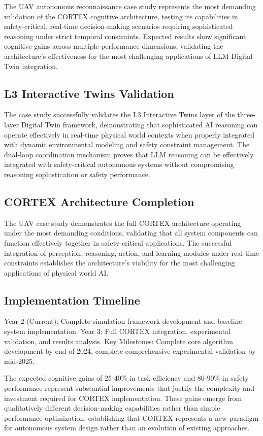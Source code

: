 The UAV autonomous reconnaissance case study represents the most demanding validation of the CORTEX cognitive architecture, testing its capabilities in safety-critical, real-time decision-making scenarios requiring sophisticated reasoning under strict temporal constraints. Expected results show significant cognitive gains across multiple performance dimensions, validating the architecture's effectiveness for the most challenging applications of LLM-Digital Twin integration.

\subsection{L3 Interactive Twins Validation}

The case study successfully validates the L3 Interactive Twins layer of the three-layer Digital Twin framework, demonstrating that sophisticated AI reasoning can operate effectively in real-time physical world contexts when properly integrated with dynamic environmental modeling and safety constraint management. The dual-loop coordination mechanism proves that LLM reasoning can be effectively integrated with safety-critical autonomous systems without compromising reasoning sophistication or safety performance.

\subsection{CORTEX Architecture Completion}

The UAV case study demonstrates the full CORTEX architecture operating under the most demanding conditions, validating that all system components can function effectively together in safety-critical applications. The successful integration of perception, reasoning, action, and learning modules under real-time constraints establishes the architecture's viability for the most challenging applications of physical world AI.

\subsection{Implementation Timeline}

Year 2 (Current): Complete simulation framework development and baseline system implementation.
Year 3: Full CORTEX integration, experimental validation, and results analysis.
Key Milestones: Complete core algorithm development by end of 2024, complete comprehensive experimental validation by mid-2025.

The expected cognitive gains of 25-40\% in task efficiency and 80-90\% in safety performance represent substantial improvements that justify the complexity and investment required for CORTEX implementation. These gains emerge from qualitatively different decision-making capabilities rather than simple performance optimization, establishing that CORTEX represents a new paradigm for autonomous system design rather than an evolution of existing approaches. 